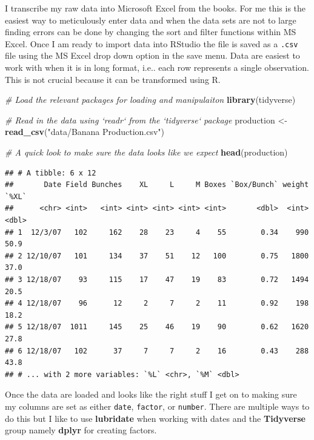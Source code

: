\documentclass[]{book}
\newenvironment{Shaded}{\begin{snugshade}}{\end{snugshade}}
\newcommand{\KeywordTok}[1]{\textcolor[rgb]{0.13,0.29,0.53}{\textbf{{#1}}}}
\newcommand{\StringTok}[1]{\textcolor[rgb]{0.31,0.60,0.02}{{#1}}}
\newcommand{\CommentTok}[1]{\textcolor[rgb]{0.56,0.35,0.01}{\textit{{#1}}}}
\newcommand{\NormalTok}[1]{{#1}}
\theoremstyle{definition}
\theoremstyle{definition}
\theoremstyle{remark}
\begin{document}
I transcribe my raw data into Microsoft Excel from the books. For me
this is the easiest way to meticulously enter data and when the data
sets are not to large finding errors can be done by changing the sort
and filter functions within MS Excel. Once I am ready to import data
into RStudio the file is saved as a \texttt{.csv} file using the MS
Excel drop down option in the save menu. Data are easiest to work with
when it is in long format, i.e.. each row represents a single
observation. This is not crucial because it can be transformed using R.

\begin{Shaded}
\begin{Highlighting}[]
\CommentTok{# Load the relevant packages for loading and manipulaiton}
\KeywordTok{library}\NormalTok{(tidyverse)}

\CommentTok{# Read in the data using `readr` from the `tidyverse` package}
\NormalTok{production <-}\StringTok{ }\KeywordTok{read_csv}\NormalTok{(}\StringTok{"data/Banana Production.csv"}\NormalTok{)}

\CommentTok{# A quick look to make sure the data looks like we expect}
\KeywordTok{head}\NormalTok{(production)}
\end{Highlighting}
\end{Shaded}

\begin{verbatim}
## # A tibble: 6 x 12
##       Date Field Bunches    XL     L     M Boxes `Box/Bunch` weight `%XL`
##      <chr> <int>   <int> <int> <int> <int> <int>       <dbl>  <int> <dbl>
## 1  12/3/07   102     162    28    23     4    55        0.34    990  50.9
## 2 12/10/07   101     134    37    51    12   100        0.75   1800  37.0
## 3 12/18/07    93     115    17    47    19    83        0.72   1494  20.5
## 4 12/18/07    96      12     2     7     2    11        0.92    198  18.2
## 5 12/18/07  1011     145    25    46    19    90        0.62   1620  27.8
## 6 12/18/07   102      37     7     7     2    16        0.43    288  43.8
## # ... with 2 more variables: `%L` <chr>, `%M` <dbl>
\end{verbatim}

Once the data are loaded and looks like the right stuff I get on to
making sure my columns are set as either \texttt{date}, \texttt{factor},
or \texttt{number}. There are multiple ways to do this but I like to use
\textbf{lubridate} \citep{R-lubridate} when working with dates and the
\textbf{Tidyverse} group namely \textbf{dplyr} \citep{R-dplyr} for
creating factors.
\end{document}

